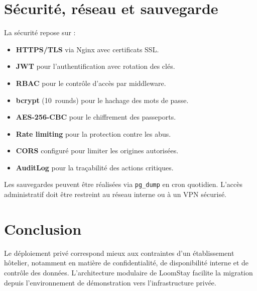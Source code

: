 \section{Sécurité, réseau et sauvegarde}
La sécurité repose sur :
\begin{itemize}
    \item \textbf{HTTPS/TLS} via Nginx avec certificats SSL.
    \item \textbf{JWT} pour l'authentification avec rotation des clés.
    \item \textbf{RBAC} pour le contrôle d'accès par middleware.
    \item \textbf{bcrypt} (10~rounds) pour le hachage des mots de passe.
    \item \textbf{AES-256-CBC} pour le chiffrement des passeports.
    \item \textbf{Rate limiting} pour la protection contre les abus.
    \item \textbf{CORS} configuré pour limiter les origines autorisées.
    \item \textbf{AuditLog} pour la traçabilité des actions critiques.
\end{itemize}

Les sauvegardes peuvent être réalisées via \texttt{pg\_dump} en cron quotidien. L'accès administratif doit être restreint au réseau interne ou à un VPN sécurisé.

\section*{Conclusion}
Le déploiement privé correspond mieux aux contraintes d'un établissement hôtelier, notamment en matière de confidentialité, de disponibilité interne et de contrôle des données. L'architecture modulaire de LoomStay facilite la migration depuis l'environnement de démonstration vers l'infrastructure privée.
